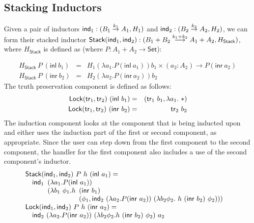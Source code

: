 \documentclass{article}
\newcommand{\Set}{\mathsf{Set}}
\begin{document}
\subsection{Stacking Inductors}

Given a pair of inductors $\mathsf{ind}_1 : (B_1 \stackrel{k_1}\to A_1, H_1)$
and $\mathsf{ind}_2 : (B_2 \stackrel{k_2}\to A_2, H_2)$, we can form their
stacked inductor $\mathsf{Stack}(\mathsf{ind}_1, \mathsf{ind}_2) : (B_1 + B_2
\stackrel{k_1 + k_2}\longrightarrow A_1 + A_2, H_{\mathsf{Stack}})$,
where $H_{\mathsf{Stack}}$ is defined as (where $P : A_1 + A_2 \to
\Set$):

\newcommand{\inl}{\mathsf{inl}}
\newcommand{\inr}{\mathsf{inr}}

\begin{eqnarray*}
  H_{\mathsf{Stack}}\ P\ (\inl\ b_1) &=& H_1(\lambda a_1. P (\inl\ a_1))b_1 \times (a_2 : A_2) \to P(\inr\ a_2)\\
  H_{\mathsf{Stack}}\ P\ (\inr\ b_2) &=& H_2(\lambda a_2. P (\inr\ a_2))b_2
\end{eqnarray*}
The truth preservation component is defined as follows:
\begin{eqnarray*}
  \mathsf{Lock}(\truth_1, \truth_2)\ (\inl\ b_1) &=& (\truth_1\ b_1, \lambda a_1.\ *)\\
  \mathsf{Lock}(\truth_1, \truth_2)\ (\inr\ b_2) &=& \truth_2\ b_2
\end{eqnarray*}
The induction component looks at the component that is being inducted
upon and either uses the induction part of the first or second
component, as appropriate. Since the user can step down from the first
component to the second component, the handler for the first component
also includes a use of the second component's inductor.
\begin{displaymath}
  \begin{array}[t]{l}
    \mathsf{Stack}(\ind_1,\ind_2)\ P\ h\ (\inl\ a_1) = \\
    \quad \ind_1
    \begin{array}[t]{l}
      (\lambda a_1. P(\inl\ a_1)) \\
      (\lambda b_1\ \phi_1. h
      \begin{array}[t]{l}
        (\inr\ b_1) \\
        (\phi_1, \ind_2\ (\lambda a_2. P(\inr\ a_2))\ (\lambda b_2 \phi_2.\ h\ (\inr\ b_2)\ \phi_2)))
      \end{array}
    \end{array}
    \\
    \mathsf{Lock}(\ind_1,\ind_2)\ P\ h\ (\inr\ a_2) = \\
    \quad \ind_2\ (\lambda a_2. P(\inr\ a_2))\ (\lambda b_2 \phi_2. h\ (\inr\ b_2)\ \phi_2)\ a_2
  \end{array}
\end{displaymath}
\end{document}
